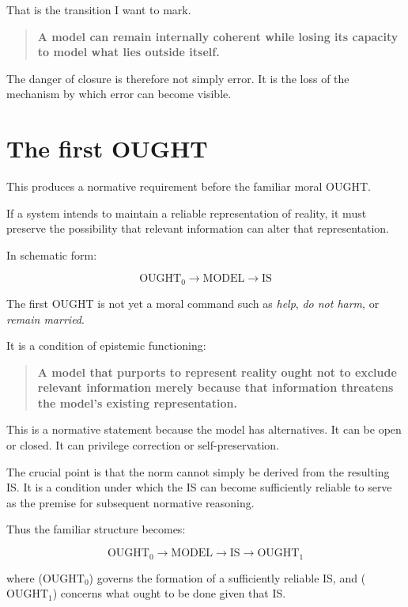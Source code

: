 \documentclass{article}
\begin{document}
That is the transition I want to mark.

\begin{quote}
    \textbf{A model can remain internally coherent while losing its capacity to model what lies outside itself.}
\end{quote}

The danger of closure is therefore not simply error. It is the loss of the mechanism by which error can become visible.

\section*{The first OUGHT}

This produces a normative requirement before the familiar moral OUGHT.

If a system intends to maintain a reliable representation of reality, it must preserve the possibility that relevant information can alter that representation.

In schematic form:

\[
\text{OUGHT}_0 \rightarrow \text{MODEL} \rightarrow \text{IS}
\]

The first OUGHT is not yet a moral command such as \textit{help}, \textit{do not harm}, or \textit{remain married}.

It is a condition of epistemic functioning:

\begin{quote}
    \textbf{A model that purports to represent reality ought not to exclude relevant information merely because that information threatens the model's existing representation.}
\end{quote}

This is a normative statement because the model has alternatives. It can be open or closed. It can privilege correction or self-preservation.

The crucial point is that the norm cannot simply be derived from the resulting IS. It is a condition under which the IS can become sufficiently reliable to serve as the premise for subsequent normative reasoning.

Thus the familiar structure becomes:

\[
\text{OUGHT}_0 \rightarrow \text{MODEL} \rightarrow \text{IS} \rightarrow \text{OUGHT}_1
\]

where (\(\text{OUGHT}_0\)) governs the formation of a sufficiently reliable IS, and (\(\text{OUGHT}_1\)) concerns what ought to be done given that IS.
\end{document}
